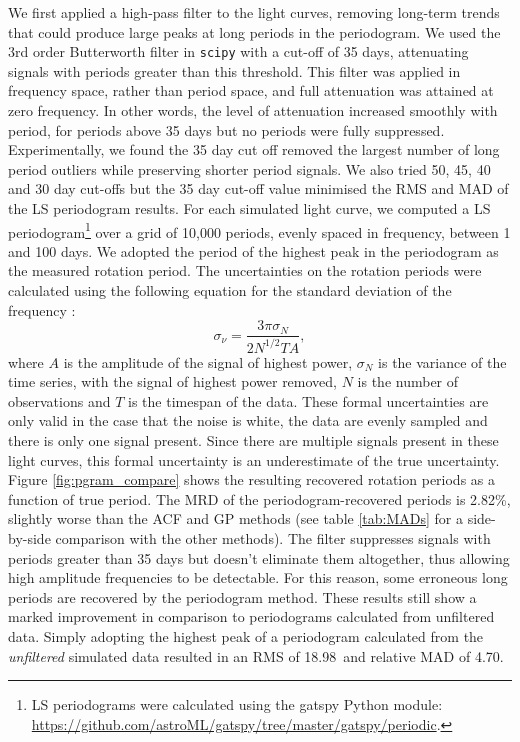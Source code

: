 \documentclass[a4paper,fleqn,usenatbib,useAMS]{mnras}
\newcommand{\response}[1]{{#1}}
\newcommand{\oldpgramRMS}{18.98}
\newcommand{\oldpercentpgramMAD}{4.70}
\newcommand{\percentpgramMAD}{2.82}
\begin{document}
\response{We first applied a high-pass filter to the light curves, removing
long-term trends that could produce large peaks at long periods in the
periodogram.
We used the 3rd order Butterworth filter in {\tt scipy} with a cut-off
of 35 days, attenuating signals with periods greater than this threshold.
This filter was applied in frequency space, rather than period space, and full
attenuation was attained at zero frequency.
In other words, the level of attenuation increased smoothly with period, for
periods above 35 days but no periods were fully suppressed.
Experimentally, we found the 35 day cut off removed the largest number of long
period outliers while preserving shorter period signals.
We also tried 50, 45, 40 and 30 day cut-offs but the 35 day cut-off value
minimised the RMS and MAD of the LS periodogram results.}
For each simulated light curve, we computed a LS periodogram\footnote{LS
periodograms were calculated using the gatspy Python module:
\url{https://github.com/astroML/gatspy/tree/master/gatspy/periodic}.} over a
grid of 10,000 periods, evenly spaced in frequency, between 1 and 100 days.
We adopted the period of the highest peak in the periodogram as the measured
rotation period.
\response{The uncertainties on the rotation periods were calculated using the
following equation for the standard deviation of the frequency
\citep{Horne1986, Kovacs1981}:
\begin{equation}
    \sigma_{\nu} = \frac{3\pi\sigma_N}{2N^{1/2}TA},
\end{equation}
where $A$ is the amplitude of the signal of highest power, $\sigma_N$ is the
variance of the time series, with the signal of highest power removed, $N$
is the number of observations and $T$ is the timespan of the data.
These formal uncertainties are only valid in the case that the noise is white,
the data are evenly sampled and there is only one signal present.
Since there are multiple signals present in these light curves, this formal
uncertainty is an underestimate of the true uncertainty.
}
Figure \ref{fig:pgram_compare} shows the resulting recovered rotation periods
as a function of true period.
\response{The MRD of the periodogram-recovered periods is \percentpgramMAD\%,
slightly worse than the ACF and GP methods (see table \ref{tab:MADs} for
a side-by-side comparison with the other methods).
The filter suppresses signals with periods greater than 35 days but doesn't
eliminate them altogether, thus allowing high amplitude frequencies to be
detectable.
For this reason, some erroneous long periods are recovered by the periodogram
method.
These results still show a marked improvement in comparison to periodograms
calculated from unfiltered data.
Simply adopting the highest peak of a periodogram calculated from the {\it
unfiltered} simulated data resulted in an RMS of \oldpgramRMS\ and relative
MAD of \oldpercentpgramMAD.}
\end{document}
